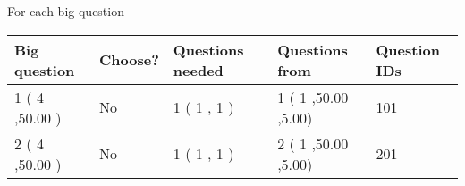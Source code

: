 \documentclass{ctexart}
\begin{document}
   
 \newpage
   
{\LARGE{For each big question}}
   
   
\vspace{0.2in}
   
   
\noindent\hspace{-0.4in}\begin{tabular}{|l|l|l|l|l|}
\hline
 Big question & Choose? & Questions needed & Questions from & Question IDs \\ 
\hline
 1 ( 4 ,50.00
 ) &  No   & 
 1 ( 1 ,  1 ) &  1 ( 1
,50.00
 ,5.00) &  101  \\
 \hline
 2 ( 4 ,50.00
 ) &  No   & 
 1 ( 1 ,  1 ) &  2 ( 1
,50.00
 ,5.00) &  201  \\
 \hline
 \end{tabular}
 
 
\end{document}
